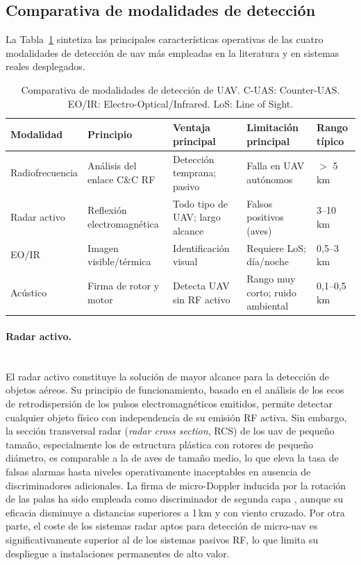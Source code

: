 \subsection{Comparativa de modalidades de detección}
\label{subsec:comparativa_modalidades}

La Tabla~\ref{tab:comparativa_modalidades} sintetiza las principales características
operativas de las cuatro modalidades de detección de \gls{uav} más empleadas en la
literatura y en sistemas reales desplegados.

\begin{table}[H]
\centering
\caption{Comparativa de modalidades de detección de UAV. C-UAS: Counter-UAS.
EO/IR: Electro-Optical/Infrared. LoS: Line of Sight.}
\label{tab:comparativa_modalidades}
\small
\begin{tabular}{lllll}
\toprule
\textbf{Modalidad} & \textbf{Principio} & \textbf{Ventaja principal} & \textbf{Limitación principal} & \textbf{Rango típico} \\
\midrule
Radiofrecuencia & Análisis del enlace C\&C RF & Detección temprana; pasivo & Falla en UAV autónomos & $>$ 5\,km \\
Radar activo   & Reflexión electromagnética  & Todo tipo de UAV; largo alcance & Falsos positivos (aves) & 3--10\,km \\
EO/IR      & Imagen visible/térmica    & Identificación visual    & Requiere LoS; día/noche & 0,5--3\,km \\
Acústico     & Firma de rotor y motor    & Detecta UAV sin RF activo & Rango muy corto; ruido ambiental & 0,1--0,5\,km \\
\bottomrule
\end{tabular}
\end{table}

\paragraph{Radar activo.}\mbox{}\\[0.5em]
El radar activo constituye la solución de mayor alcance para la detección de objetos
aéreos. Su principio de funcionamiento, basado en el análisis de los ecos de
retrodispersión de los pulsos electromagnéticos emitidos, permite detectar cualquier
objeto físico con independencia de su emisión RF activa. Sin embargo, la sección
transversal radar (\textit{radar cross section}, RCS) de los \gls{uav} de pequeño
tamaño, especialmente los de estructura plástica con rotores de pequeño diámetro,
es comparable a la de aves de tamaño medio, lo que eleva la tasa de falsas alarmas
hasta niveles operativamente inaceptables en ausencia de discriminadores adicionales.
La firma de micro-Doppler inducida por la rotación de las palas ha sido empleada
como discriminador de segunda capa \cite{martelli_exploitation_2020}, aunque su
eficacia disminuye a distancias superiores a 1\,km y con viento cruzado. Por otra
parte, el coste de los sistemas radar aptos para detección de micro-\gls{uav} es
significativamente superior al de los sistemas pasivos RF, lo que limita su
despliegue a instalaciones permanentes de alto valor.

